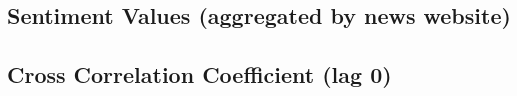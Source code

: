 \documentclass[12pt,a4paper,notitlepage]{article}
\begin{document}
\begin{minipage}[t]{0.49\textwidth}
	
\end{minipage}
\begin{minipage}[t]{0.49\textwidth}
	
\end{minipage}

\subsection{Sentiment Values (aggregated by news website)}\label{apx_sentscore_site}

\begin{minipage}[t]{0.49\textwidth}
	
\end{minipage}
\begin{minipage}[t]{0.49\textwidth}
	
\end{minipage}

\subsection{Cross Correlation Coefficient (lag 0)}\label{apx_ccf}

\end{document}
